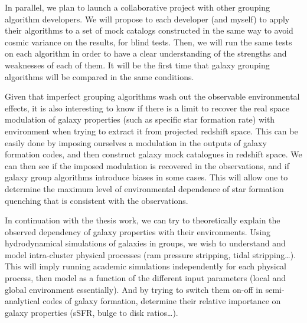 In parallel, we plan to launch a collaborative project with other grouping
algorithm developers. We will propose to each developer (and myself) to apply
their algorithms to a set of mock catalogs constructed in the same way to avoid
cosmic variance on the results, for blind tests. Then, we will run the same
tests on each algorithm in order to have a clear understanding of the strengths
and weaknesses of each of them. It will be the first time that galaxy grouping
algorithms will be compared in the same conditions.

Given that imperfect grouping algorithms wash out the observable environmental
effects, it is also interesting to know if there is a limit to recover the real
space modulation of galaxy properties (such as specific star formation rate)
with environment when trying to extract it from projected redshift space. This
can be easily done by imposing ourselves a modulation in the outputs of galaxy
formation codes, and then construct galaxy mock catalogues in redshift space.
We can then see if the imposed modulation is recovered in the observations, and
if galaxy group algorithms introduce biases in some cases. This will allow one
to determine the maximum level of environmental dependence of star formation
quenching that is consistent with the observations.

In continuation with the thesis work, we can try to theoretically explain the
observed dependency of galaxy properties with their environments. Using
hydrodynamical simulations of galaxies in groups, we wish to understand and
model intra-cluster physical processes (ram pressure stripping, tidal
stripping\ldots). This will imply running academic simulations independently
for each physical process, then model as a function of the different input
parameters (local and global environment essentially). And by trying to switch
them on-off in semi-analytical codes of galaxy formation, determine their
relative importance on galaxy properties (sSFR, bulge to disk ratios\ldots).

